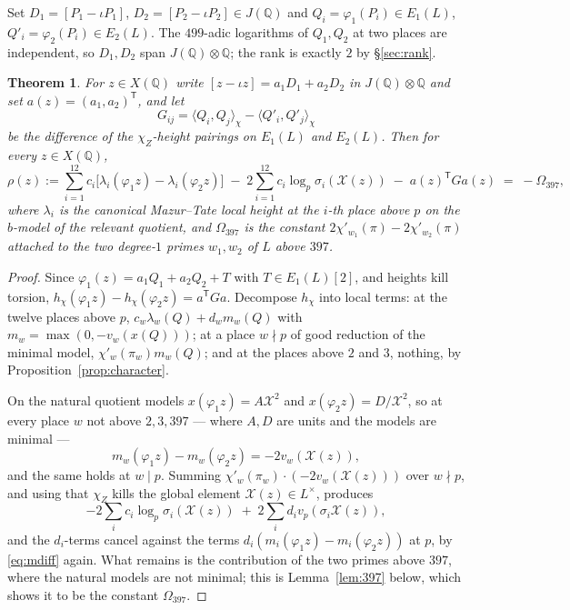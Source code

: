 \documentclass[11pt,reqno]{amsart}
\theoremstyle{plain}
\newtheorem{theorem}{Theorem}[section]
\theoremstyle{definition}
\newcommand{\Q}{\mathbb{Q}}
\numberwithin{equation}{section}
\begin{document}
Set $D_{1}=[P_{1}-\iota P_{1}]$, $D_{2}=[P_{2}-\iota P_{2}]\in J(\Q)$ and
$Q_{i}=\varphi_{1}(P_{i})\in E_{1}(L)$, $Q'_{i}=\varphi_{2}(P_{i})\in E_{2}(L)$.
The $499$-adic logarithms of $Q_{1},Q_{2}$ at two places are independent, so
$D_{1},D_{2}$ span $J(\Q)\otimes\Q$; the rank is exactly $2$ by
\S\ref{sec:rank}.

\begin{theorem}\label{thm:identity}
For $z\in X(\Q)$ write $[z-\iota z]=a_{1}D_{1}+a_{2}D_{2}$ in $J(\Q)\otimes\Q$
and set $a(z)=(a_{1},a_{2})^{\mathsf T}$, and let
\[
  G_{ij}=\langle Q_{i},Q_{j}\rangle_{\chi}-\langle Q'_{i},Q'_{j}\rangle_{\chi}
\]
be the difference of the $\chi_{Z}$-height pairings on $E_{1}(L)$ and
$E_{2}(L)$. Then for every $z\in X(\Q)$,
\begin{equation}\label{eq:identity}
  \rho(z):=\sum_{i=1}^{12}c_{i}\bigl[\lambda_{i}(\varphi_{1}z)-\lambda_{i}(\varphi_{2}z)\bigr]
  \;-\;2\sum_{i=1}^{12}c_{i}\log_{p}\sigma_{i}(\mathcal{X}(z))
  \;-\;a(z)^{\mathsf T}Ga(z)\;=\;-\Omega_{397},
\end{equation}
where $\lambda_{i}$ is the canonical Mazur--Tate local height at the $i$-th place
above $p$ on the $b$-model of the relevant quotient, and $\Omega_{397}$ is the
constant $2\chi'_{w_{1}}(\pi)-2\chi'_{w_{2}}(\pi)$ attached to the two degree-$1$
primes $w_{1},w_{2}$ of $L$ above $397$.
\end{theorem}

\begin{proof}
Since $\varphi_{1}(z)=a_{1}Q_{1}+a_{2}Q_{2}+T$ with $T\in E_{1}(L)[2]$, and
heights kill torsion, $h_{\chi}(\varphi_{1}z)-h_{\chi}(\varphi_{2}z)=a^{\mathsf T}Ga$.
Decompose $h_{\chi}$ into local terms: at the twelve places above $p$,
$c_{w}\lambda_{w}(Q)+d_{w}m_{w}(Q)$ with $m_{w}=\max(0,-v_{w}(x(Q)))$; at a
place $w\nmid p$ of good reduction of the minimal model, $\chi'_{w}(\pi_{w})m_{w}(Q)$;
and at the places above $2$ and $3$, nothing, by Proposition~\ref{prop:character}.

On the natural quotient models $x(\varphi_{1}z)=A\mathcal{X}^{2}$ and
$x(\varphi_{2}z)=D/\mathcal{X}^{2}$, so at every place $w$ not above $2,3,397$ ---
where $A,D$ are units and the models are minimal ---
\begin{equation}\label{eq:mdiff}
  m_{w}(\varphi_{1}z)-m_{w}(\varphi_{2}z)=-2v_{w}(\mathcal{X}(z)),
\end{equation}
and the same holds at $w\mid p$. Summing $\chi'_{w}(\pi_{w})\cdot(-2v_{w}(\mathcal{X}(z)))$
over $w\nmid p$, and using that $\chi_{Z}$ kills the global element
$\mathcal{X}(z)\in L^{\times}$, produces
\[
  -2\sum_{i}c_{i}\log_{p}\sigma_{i}(\mathcal{X}(z))
  \;+\;2\sum_{i}d_{i}v_{p}(\sigma_{i}\mathcal{X}(z)),
\]
and the $d_{i}$-terms cancel against the terms
$d_{i}(m_{i}(\varphi_{1}z)-m_{i}(\varphi_{2}z))$ at $p$, by \eqref{eq:mdiff}
again. What remains is the contribution of the two primes above $397$, where the
natural models are not minimal; this is Lemma~\ref{lem:397} below, which shows
it to be the constant $\Omega_{397}$.
\end{proof}
\end{document}

